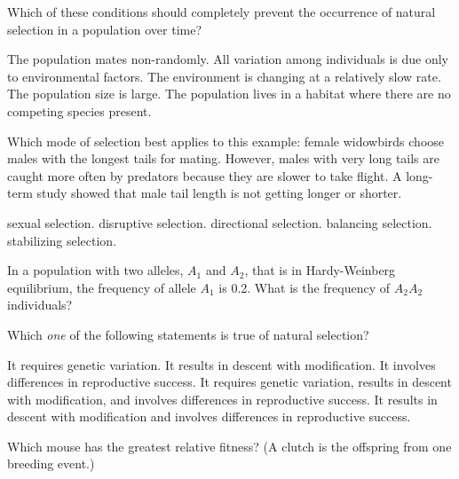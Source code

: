 
\question
Which of these conditions should completely prevent the occurrence of natural selection in a population over time?

\begin{choices}
\choice The population mates non-randomly.
\correctchoice All variation among individuals is due only to environmental factors. 
\choice The environment is changing at a relatively slow rate. 
\choice The population size is large. 
\choice The population lives in a habitat where there are no competing species present. 
\end{choices}

\question
Which mode of selection best applies to this example: female widowbirds choose males with the longest tails for mating. However, males with very long tails are caught more often by predators because they are slower to take flight. A long-term study showed that male tail length is not getting longer or shorter. 

\begin{choices}
\choice sexual selection. 
\choice disruptive selection. 
\choice directional selection. 
\choice balancing selection. 
\correctchoice stabilizing selection. 
\end{choices}

\question
In a population with two alleles, $A_1$ and $A_2$, that is in Hardy-Weinberg equilibrium, the frequency of allele $A_1$ is 0.2. What is the frequency of $A_2A_2$ individuals? 

\begin{choices}
\end{choices}

\question
Which \emph{one} of the following statements is true of natural selection?

\begin{choices}
\choice It requires genetic variation. 
\choice It results in descent with modification. 
\choice It involves differences in reproductive success. 
\correctchoice It requires genetic variation, results in descent with modification, and involves differences in reproductive success. 
\choice It results in descent with modification and involves differences in reproductive success. 
\end{choices}

\question
Which mouse has the greatest relative fitness? (A clutch is the offspring from one breeding event.)

